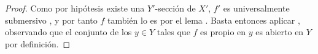 \begin{proof}
Como por hipótesis existe una $Y'$-sección de $X'$, $f'$ es universalmente submersivo , y por tanto $f$ también lo es por el lema .
Basta entonces aplicar , observando que el conjunto de los $y\in Y$ tales que $f$ es propio en $y$ es abierto en $Y$ por definición.
\end{proof}
